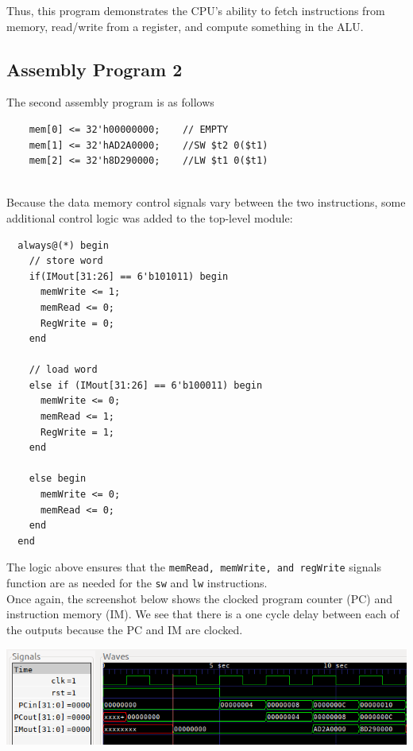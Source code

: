 \documentclass[twocolumn]{article}
\newcommand{\cc}[1]{\texttt{#1}}
\begin{document}
Thus, this program demonstrates the CPU's ability to fetch instructions from memory, read/write from a register, and compute something in the ALU.

\subsection{Assembly Program 2}

The second assembly program is as follows

\begin{lstlisting}
    mem[0] <= 32'h00000000;    // EMPTY
    mem[1] <= 32'hAD2A0000;    //SW $t2 0($t1)
    mem[2] <= 32'h8D290000;    //LW $t1 0($t1)
\end{lstlisting}
\\
Because the data memory control signals vary between the two instructions, some additional control logic was added to the top-level module:\\

\begin{lstlisting}
  always@(*) begin
    // store word
    if(IMout[31:26] == 6'b101011) begin
      memWrite <= 1;
      memRead <= 0;
      RegWrite = 0;
    end

    // load word
    else if (IMout[31:26] == 6'b100011) begin
      memWrite <= 0;
      memRead <= 1;
      RegWrite = 1;
    end

    else begin
      memWrite <= 0;
      memRead <= 0;
    end
  end
\end{lstlisting}

\newpage

The logic above ensures that the \cc{memRead, memWrite, and regWrite} signals function are as needed for the \cc{sw} and \cc{lw} instructions.\\

Once again, the screenshot below shows the clocked program counter (PC) and instruction memory (IM). We see that there is a one cycle delay between each of the outputs because the PC and IM are clocked.

\begingroup
    \centering
    \medskip
    \includegraphics[width=\columnwidth]{Lab-Tex/Lab4-images/p2_1.png}
    \medskip
\endgroup
\\
\end{document}
